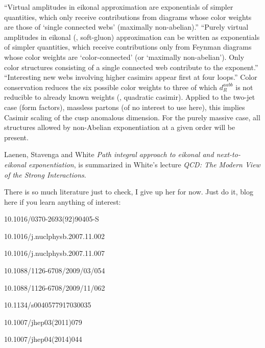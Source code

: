 {``Virtual amplitudes in eikonal approximation are exponentials of simpler
quantities, which only receive contributions from diagrams whose color
weights are those of `single connected webs' (maximally
non-abelian).''
``Purely virtual amplitudes in eikonal (\ie, soft-gluon) approximation
can be written as exponentials of simpler quantities, which receive
contributions only from Feynman diagrams whose color weights are
`color-connected' (or `maximally non-abelian'). Only color structures
consisting of a single connected web contribute to the exponent.''
``Interesting new webs involving higher casimirs appear first at four
loops.''
Color conservation reduces the six possible color weights to three of
which $d_R^{aabb}$ is not reducible to already known weights (\ie,
quadratic casimir). Applied to the two-jet case (form factors), massless
partons (of no interest to use here), this implies Casimir scaling of the
cusp anomalous dimension. For the purely massive case, all structures
allowed by non-Abelian exponentiation at a given order will be present.

Laenen, Stavenga and White
{\em Path integral approach to eikonal and next-to-eikonal exponentiation},
is summarized in White's
{lecture} {\em QCD: The Modern View of the Strong Interactions}.

There is so much literature just to check, I give up her for now.
Just do it, blog here if you learn anything of interest:

 {10.1016/0370-2693(92)90405-S}

 {10.1016/j.nuclphysb.2007.11.002}

 {10.1016/j.nuclphysb.2007.11.007}


 {10.1088/1126-6708/2009/03/054}

 {10.1088/1126-6708/2009/11/062}

 {10.1134/s0040577917030035}

 {10.1007/jhep03(2011)079}

 {10.1007/jhep04(2014)044}

}
